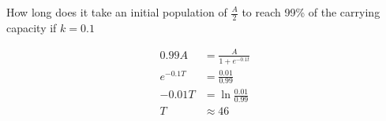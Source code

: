 How long does it take an initial population of $\frac{A}{2}$ to reach 99\% of the carrying capacity if $k = 0.1$

\begin{solution}
    \begin{align*}
        0.99A &= \frac{A}{1 + e^{-0.1t}} \\
        e^{-0.1T} &= \frac{0.01}{0.99} \\
        -0.01T &= \ln{\frac{0.01}{0.99}} \\
        T &\approx 46
    \end{align*}
\end{solution}